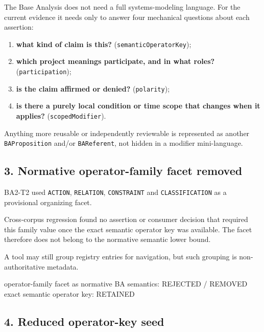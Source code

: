 \documentclass[
  10pt,
  a4paper,
]{article}
\newenvironment{Shaded}{}{}
\newcommand{\NormalTok}[1]{#1}
\providecommand{\tightlist}{%
  \setlength{\itemsep}{0pt}\setlength{\parskip}{0pt}}
\begin{document}
The Base Analysis does not need a full systems-modeling language. For
the current evidence it needs only to answer four mechanical questions
about each assertion:

\begin{enumerate}
\def\labelenumi{\arabic{enumi}.}
\tightlist
\item
  \textbf{what kind of claim is this?} (\texttt{semanticOperatorKey});
\item
  \textbf{which project meanings participate, and in what roles?}
  (\texttt{participation});
\item
  \textbf{is the claim affirmed or denied?} (\texttt{polarity});
\item
  \textbf{is there a purely local condition or time scope that changes
  when it applies?} (\texttt{scopedModifier}).
\end{enumerate}

Anything more reusable or independently reviewable is represented as
another \texttt{BAProposition} and/or \texttt{BAReferent}, not hidden in
a modifier mini-language.

\subsection{3. Normative operator-family facet
removed}\label{3-normative-operator-family-facet-removed}

BA2-T2 used \texttt{ACTION}, \texttt{RELATION}, \texttt{CONSTRAINT} and
\texttt{CLASSIFICATION} as a provisional organizing facet.

Cross-corpus regression found no assertion or consumer decision that
required this family value once the exact semantic operator key was
available. The facet therefore does not belong to the normative semantic
lower bound.

A tool may still group registry entries for navigation, but such
grouping is non-authoritative metadata.

\begin{Shaded}
\begin{Highlighting}[]
\NormalTok{operator{-}family facet as normative BA semantics: REJECTED / REMOVED}
\NormalTok{exact semantic operator key: RETAINED}
\end{Highlighting}
\end{Shaded}

\subsection{4. Reduced operator-key
seed}\label{4-reduced-operator-key-seed}
\end{document}
